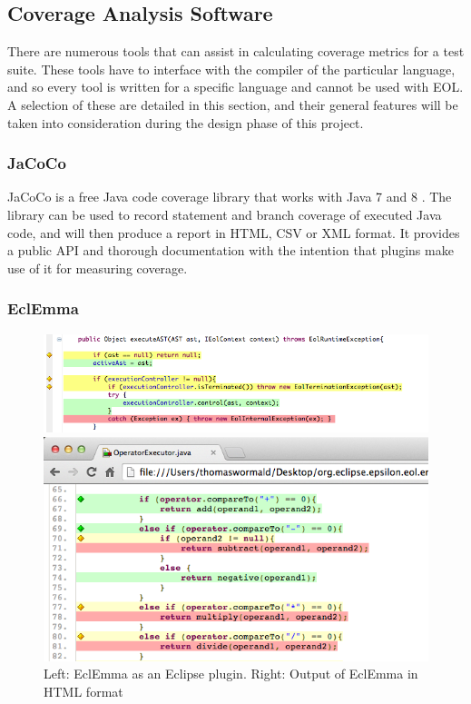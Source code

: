 \subsection{Coverage Analysis Software}

There are numerous tools that can assist in calculating coverage metrics for a test suite. These tools have to interface with the compiler of the particular language, and so every tool is written for a specific language and cannot be used with EOL. A selection of these are detailed in this section, and their general features will be taken into consideration during the design phase of this project.

\subsubsection{JaCoCo}

JaCoCo is a free Java code coverage library that works with Java 7 and 8 \cite{JaCoCo}. The library can be used to record statement and branch coverage of executed Java code, and will then produce a report in HTML, CSV or XML format. It provides a public API and thorough documentation with the intention that plugins make use of it for measuring coverage.

\subsubsection{EclEmma}

\begin{figure}
\begin{minipage}[b]{0.44\textwidth}
\centering
\includegraphics[width=0.9\linewidth]{figures/EclEmma}
\end{minipage}
\begin{minipage}[b]{0.1\textwidth}
\vspace{3.00mm}
\end{minipage}
\begin{minipage}[b]{0.44\textwidth}
\centering
\includegraphics[width=0.9\linewidth]{figures/EclEmmaHTML}
\end{minipage}
\caption{Left: EclEmma as an Eclipse plugin. Right: Output of EclEmma in HTML format}
\label{fig:eclemma}
\end{figure}

